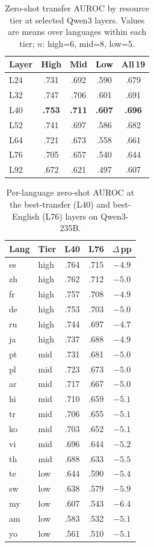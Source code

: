\documentclass[11pt,a4paper]{article}
\begin{document}
\begin{table}[t]
\centering
\small
\caption{Zero-shot transfer AUROC by resource tier at selected Qwen3 layers. Values are means over languages within each tier; $n$: high=6, mid=8, low=5.}
\label{tab:qwen3_transfer_tier}
\begin{tabular}{lcccc}
\toprule
Layer & High & Mid & Low & All\,19 \\
\midrule
L24 & .731 & .692 & .590 & .679 \\
L32 & .747 & .706 & .601 & .691 \\
L40 & \textbf{.753} & \textbf{.711} & \textbf{.607} & \textbf{.696} \\
L52 & .741 & .697 & .586 & .682 \\
L64 & .721 & .673 & .558 & .661 \\
L76 & .705 & .657 & .540 & .644 \\
L92 & .672 & .621 & .497 & .607 \\
\bottomrule
\end{tabular}
\end{table}

\begin{table}[t]
\centering
\small
\caption{Per-language zero-shot AUROC at the best-transfer (L40) and best-English (L76) layers on Qwen3-235B.}
\label{tab:qwen3_perlang}
\begin{tabular}{llccc}
\toprule
Lang & Tier & L40 & L76 & $\Delta$\,pp \\
\midrule
es & high & .764 & .715 & $-4.9$ \\
zh & high & .762 & .712 & $-5.0$ \\
fr & high & .757 & .708 & $-4.9$ \\
de & high & .753 & .703 & $-5.0$ \\
ru & high & .744 & .697 & $-4.7$ \\
ja & high & .737 & .688 & $-4.9$ \\
\midrule
pt & mid & .731 & .681 & $-5.0$ \\
pl & mid & .723 & .673 & $-5.0$ \\
ar & mid & .717 & .667 & $-5.0$ \\
hi & mid & .710 & .659 & $-5.1$ \\
tr & mid & .706 & .655 & $-5.1$ \\
ko & mid & .703 & .652 & $-5.1$ \\
vi & mid & .696 & .644 & $-5.2$ \\
th & mid & .688 & .633 & $-5.5$ \\
\midrule
te & low & .644 & .590 & $-5.4$ \\
sw & low & .638 & .579 & $-5.9$ \\
my & low & .607 & .543 & $-6.4$ \\
am & low & .583 & .532 & $-5.1$ \\
yo & low & .561 & .510 & $-5.1$ \\
\bottomrule
\end{tabular}
\end{table}
\end{document}
